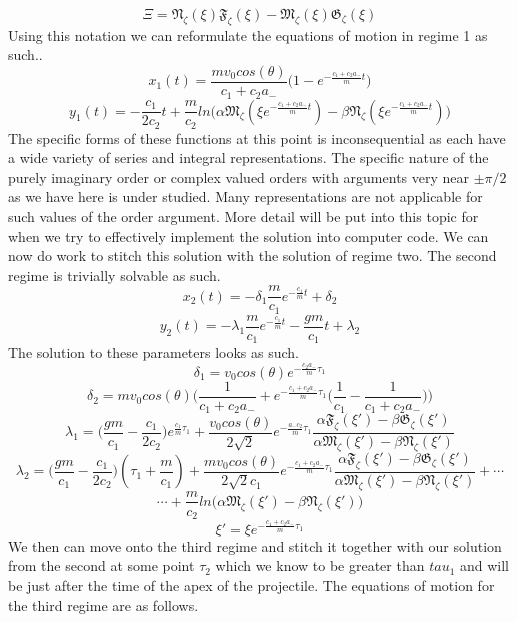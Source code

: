 \documentclass{article}
\begin{document}
$$
\Xi = \mathfrak{N}_{\zeta}(\xi)\mathfrak{F}_{\zeta}(\xi)-\mathfrak{M}_{\zeta}(\xi)\mathfrak{G}_{\zeta}(\xi)
$$
Using this notation we can reformulate the equations of motion in regime 1 as such..
$$
x_{1}(t) = \frac{mv_{0}cos(\theta)}{c_{1}+c_{2}a_{-}}\bigg( 1-e^{-\frac{c_{1}+c_{2}a_{-}}{m}t} \bigg)
$$
$$
y_{1}(t) = -\frac{c_{1}}{2 c_{2}}t +\frac{m}{c_{2}}ln\bigg(\alpha \mathfrak{M}_{\zeta}(\xi e^{-\frac{c_{1}+c_{2}a_{-}}{m}t})-\beta \mathfrak{N}_{\zeta}(\xi e^{-\frac{c_{1}+c_{2}a_{-}}{m}t})\bigg)
$$
The specific forms of these functions at this point is inconsequential as each have a wide variety of series and integral representations. The specific nature of the purely imaginary order or complex valued orders with arguments very near $\pm \pi/2$ as we have here is under studied. Many representations are not applicable for such values of the order argument. More detail will be put into this topic for when we try to effectively implement the solution into computer code. We can now do work to stitch this solution with the solution of regime two. The second regime is trivially solvable as such.
$$
x_{2}(t) = -\delta_{1}\frac{m}{c_{1}}e^{-\frac{c_{1}}{m}t}+\delta_{2}
$$
$$
y_{2}(t) = -\lambda_{1} \frac{m}{c_{1}}e^{-\frac{c_{1}}{m}t}-\frac{gm}{c_{1}}t+\lambda_{2}
$$
The solution to these parameters looks as such.
$$
\delta_{1} = v_{0}cos(\theta)e^{-\frac{c_{2}a_{-}}{m}\tau_{1}}
$$
$$
\delta_{2} = mv_{0}cos(\theta)\bigg(\frac{1}{c_{1}+c_{2}a_{-}}+e^{-\frac{c_{1}+c_{2}a_{-}}{m}\tau_{1}}\bigg(\frac{1}{c_{1}}-\frac{1}{c_{1}+c_{2}a_{-}}\bigg)\bigg)
$$
$$
\lambda_{1} = \bigg(\frac{gm}{c_{1}}-\frac{c_{1}}{2c_{2}} \bigg)e^{\frac{c_{1}}{m}\tau_{1}}+\frac{v_{0}cos(\theta)}{2\sqrt{2}}e^{-\frac{a_{-}c_{2}}{m}\tau_{1}}\frac{\alpha \mathfrak{F}_{\zeta}(\xi')-\beta\mathfrak{G}_{\zeta}(\xi')}{\alpha \mathfrak{M}_{\zeta}(\xi')-\beta\mathfrak{N}_{\zeta}(\xi')}
$$
$$
\lambda_{2} = \bigg( \frac{gm}{c_{1}}-\frac{c_{1}}{2c_{2}} \bigg)(\tau_{1}+\frac{m}{c_{1}})+\frac{mv_{0}cos(\theta)}{2\sqrt{2}c_{1}}e^{-\frac{c_{1}+c_{2}a_{-}}{m}\tau_{1}}\frac{\alpha \mathfrak{F}_{\zeta}(\xi')-\beta\mathfrak{G}_{\zeta}(\xi')}{\alpha \mathfrak{M}_{\zeta}(\xi')-\beta\mathfrak{N}_{\zeta}(\xi')}+\cdots 
$$
$$
\cdots + \frac{m}{c_{2}}ln\bigg( \alpha\mathfrak{M}_{\zeta}(\xi')-\beta\mathfrak{N}_{\zeta}(\xi') \bigg)
$$
$$
\xi'= \xi e^{-\frac{c_{1}+c_{2}a_{-}}{m}\tau_{1}}
$$
We then can move onto the third regime and stitch it together with our solution from the second at some point $\tau_{2}$ which we know to be greater than $tau_{1}$ and will be just after the time of the apex of the projectile. The equations of motion for the third regime are as follows.
\end{document}
